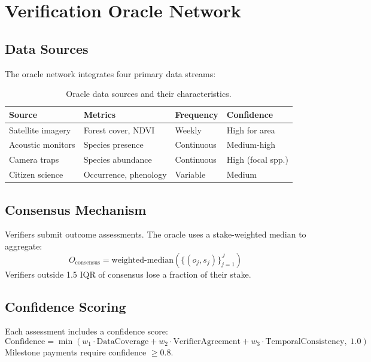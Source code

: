 \section{Verification Oracle Network}

\label{sec:oracle}

\subsection{Data Sources}

The oracle network integrates four primary data streams:

\begin{table}[H]
\centering
\caption{Oracle data sources and their characteristics.}
\label{tab:oracle_sources}
\begin{tabular}{p{2.5cm}p{3cm}p{2cm}p{3cm}}
\toprule
\textbf{Source} & \textbf{Metrics} & \textbf{Frequency} &
  \textbf{Confidence} \\
\midrule
Satellite imagery & Forest cover, NDVI & Weekly & High for area \\
Acoustic monitors & Species presence & Continuous & Medium-high \\
Camera traps & Species abundance & Continuous & High (focal spp.) \\
Citizen science & Occurrence, phenology & Variable & Medium \\
\bottomrule
\end{tabular}
\end{table}

\subsection{Consensus Mechanism}

Verifiers submit outcome assessments. The oracle uses a stake-weighted
median to aggregate:
\begin{equation}
  O_{\text{consensus}} = \text{weighted-median}\!\left(
    \{(o_j, s_j)\}_{j=1}^{J}\right)
\end{equation}
Verifiers outside 1.5 IQR of consensus lose a fraction of their stake.

\subsection{Confidence Scoring}

Each assessment includes a confidence score:
\begin{equation}
  \text{Confidence} = \min\!\left(
    w_1 \cdot \text{DataCoverage} +
    w_2 \cdot \text{VerifierAgreement} +
    w_3 \cdot \text{TemporalConsistency},\; 1.0
  \right)
\end{equation}
Milestone payments require confidence $\geq 0.8$.


